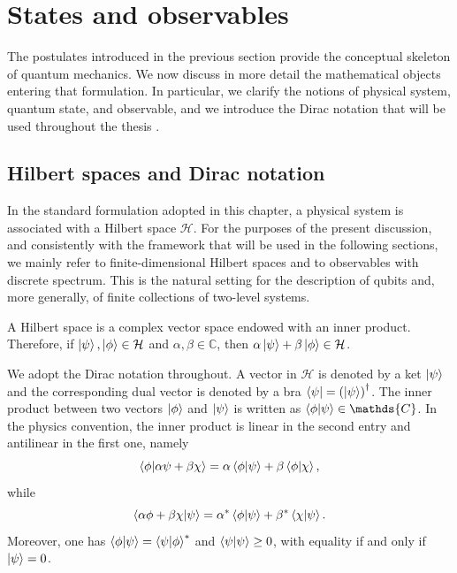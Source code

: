 \section{States and observables}
\label{sec:states_observables}

The postulates introduced in the previous section provide the conceptual skeleton of quantum mechanics. We now discuss in more detail the mathematical objects entering that formulation. In particular, we clarify the notions of physical system, quantum state, and observable, and we introduce the Dirac notation that will be used throughout the thesis \cite{Dirac30,Sakurai17}.

\subsection{Hilbert spaces and Dirac notation}

In the standard formulation adopted in this chapter, a physical system is associated with a Hilbert space $\mathcal{H}$. For the purposes of the present discussion, and consistently with the framework that will be used in the following sections, we mainly refer to finite-dimensional Hilbert spaces and to observables with discrete spectrum. This is the natural setting for the description of qubits and, more generally, of finite collections of two-level systems.

A Hilbert space is a complex vector space endowed with an inner product. Therefore, if $\ket{\psi},\ket{\phi}\in\mathcal{H}$ and $\alpha,\beta\in\mathds{C}$, then $\alpha\ket{\psi}+\beta\ket{\phi}\in\mathcal{H}$.

We adopt the Dirac notation throughout. A vector in $\mathcal{H}$ is denoted by a ket $\ket{\psi}$ and the corresponding dual vector is denoted by a bra $\bra{\psi}=\left(\ket{\psi}\right)^\dagger$. The inner product between two vectors $\ket{\phi}$ and $\ket{\psi}$ is written as $\braket{\phi}{\psi}\in\mathds{C}$. In the physics convention, the inner product is linear in the second entry and antilinear in the first one, namely
\begin{equation}
	\braket{\phi}{\alpha\psi+\beta\chi}
	=
	\alpha\braket{\phi}{\psi}
	+
	\beta\braket{\phi}{\chi},
	\label{eq:intro_qm_inner_product_linearity_second}
\end{equation}
while
\begin{equation}
	\braket{\alpha\phi+\beta\chi}{\psi}
	=
	\alpha^*\braket{\phi}{\psi}
	+
	\beta^*\braket{\chi}{\psi}.
	\label{eq:intro_qm_inner_product_antilinearity_first}
\end{equation}
Moreover, one has $\braket{\phi}{\psi}=\braket{\psi}{\phi}^*$ and $\braket{\psi}{\psi}\geq 0$, with equality if and only if $\ket{\psi}=0$.

